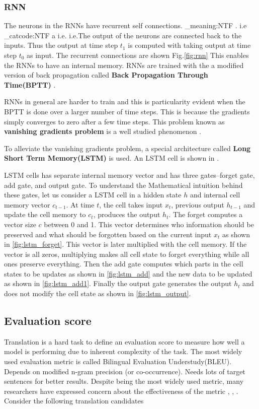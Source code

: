 \documentclass[conference]{IEEEtran}
\makeatletter
\newcommand\latinabbrev[1]{
  \peek_meaning:NTF . {%
    #1\@}%
  { \peek_catcode:NTF a {%
      #1.\@ }%
    {#1.\@}}}
\def\ie{\latinabbrev{i.e}}
\makeatother
\begin{document}
\subsubsection{RNN}
The neurons in the RNNs have recurrent self connections. \ie The output of the neurons are connected back to the inputs. Thus the output at time step $t_1$ is computed with taking output at time step $t_0$ as input. The recurrent connections are shown Fig.\ref{fig:rnn} This enables the RNNs to have an internal memory. RNNs are trained with the a modified version of back propagation called \textbf{Back Propagation Through Time(BPTT)}  \cite{werbos1990backpropagation}.

RNNs in general are harder to train and this is particularity evident when the BPTT is done over a larger number of time steps. This is because the gradients simply converges to zero after a few time steps. This problem known as \textbf{vanishing gradients problem} is a well studied phenomenon \cite{bengio1994learning}.  

To alleviate the vanishing gradients problem, a special architecture called \textbf{Long Short Term Memory(LSTM)} \cite{hochreiter1997long} is used. An LSTM cell is shown in \label{fig:lstm}.

LSTM cells has separate internal memory vector and has three gates--forget gate, add gate, and output gate. To understand the Mathematical intuition behind these gates, let us consider a LSTM cell in a hidden state $h$ and internal cell memory vector $c_{t-1}$. At time $t$, the cell takes input $x_t$, previous output $h_{t-1}$ and update the cell memory to $c_{t}$, produces the output $h_{t}$. The forget computes a vector size $c$ between 0 and 1. This vector determines who information should be preserved and what should be forgotten based on the current input $x_t$ as shown in \ref{fig:lstm_forget}. This vector is later multiplied with the cell memory. If the vector is all zeros, multiplying makes all cell state to forget everything while all ones preserve everything. Then the add gate computes which parts in the cell states to be updates as shown in  \ref{fig:lstm_add} and the new data to be updated as shown in \ref{fig:lstm_add1}. Finally the output gate generates the output $h_t$ and does not modify the cell state as shown in \ref{fig:lstm_output}.


\subsection{Evaluation score}
Translation is a hard  task to define an evaluation score to measure how well a model is performing due to inherent complexity of the task. The most widely used evaluation metric is called Bilingual Evaluation Understudy(BLEU)\cite{papineni2002bleu}. Depends on modified n-gram precision (or co-occurrence). Needs lots of target sentences for better results. Despite being the most widely used metric, many researchers have expressed concern about the effectiveness of the metric \cite{zhang2004interpreting}, \cite{callison2006re}, \cite{ananthakrishnan2007some}. Consider the following translation candidates 
\end{document}
